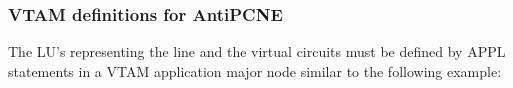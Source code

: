 \documentclass[letterpaper,10pt,english]{sphinxmanual}
\begin{document}





\subsubsection{VTAM definitions for AntiPCNE}
\label{\detokenize{connectivity_guide:vtam-definitions-for-antipcne}}
The LU’s representing the line and the virtual circuits must be defined by APPL statements in a VTAM application major node similar to the following example:

\begin{sphinxVerbatim}[commandchars=\\\{\}]
  
  
           

\end{sphinxVerbatim}
\end{document}
